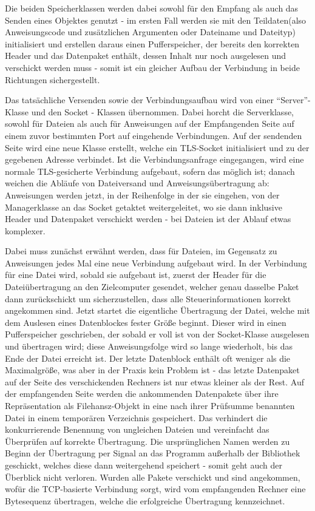Die beiden Speicherklassen werden dabei sowohl für den Empfang als auch das Senden eines Objektes genutzt - im ersten Fall werden sie mit den Teildaten(also Anweisungscode und zusätzlichen Argumenten oder Dateiname und Dateityp) initialisiert und erstellen daraus einen Pufferspeicher, der bereits den korrekten Header und das Datenpaket enthält, dessen Inhalt nur noch ausgelesen und verschickt werden muss - somit ist ein gleicher Aufbau der Verbindung in beide Richtungen sichergestellt.\par
Das tatsächliche Versenden sowie der Verbindungsaufbau wird von einer "`Server"'-Klasse und den Socket - Klassen übernommen.
Dabei horcht die Serverklasse, sowohl für Dateien als auch für Anweisungen auf der Empfangenden Seite auf einem zuvor bestimmten Port auf eingehende Verbindungen.
Auf der sendenden Seite wird eine neue Klasse erstellt, welche ein TLS-Socket initialisiert und zu der gegebenen Adresse verbindet.
Ist die Verbindungsanfrage eingegangen, wird eine normale TLS-gesicherte Verbindung aufgebaut, sofern das möglich ist; danach weichen die Abläufe von Dateiversand und Anweisungsübertragung ab: Anweisungen werden jetzt, in der Reihenfolge in der sie eingehen, von der Managerklasse an das Socket getaktet weitergeleitet, wo sie dann inklusive Header und Datenpaket verschickt werden - bei Dateien ist der Ablauf etwas komplexer.\\\par
Dabei muss zunächst erwähnt werden, dass für Dateien, im Gegensatz zu Anweisungen jedes Mal eine neue Verbindung aufgebaut wird.
In der Verbindung für eine Datei wird, sobald sie aufgebaut ist, zuerst der Header für die Dateiübertragung an den Zielcomputer gesendet, welcher genau dasselbe Paket dann zurückschickt um sicherzustellen, dass alle Steuerinformationen korrekt angekommen sind.
Jetzt startet die eigentliche Übertragung der Datei, welche mit dem Auslesen eines Datenblockes fester Größe beginnt.
Dieser wird in einen Pufferspeicher geschrieben, der sobald er voll ist von der Socket-Klasse ausgelesen und übertragen wird; diese Anweisungsfolge wird so lange wiederholt, bis das Ende der Datei erreicht ist.
Der letzte Datenblock enthält oft weniger als die Maximalgröße, was aber in der Praxis kein Problem ist - das letzte Datenpaket auf der Seite des verschickenden Rechners ist nur etwas kleiner als der Rest.
Auf der empfangenden Seite werden die ankommenden Datenpakete über ihre Repräsentation als Filehansz-Objekt in eine nach ihrer Prüfsumme benannten Datei in einem temporären Verzeichnis gespeichert. 
Das verhindert die konkurrierende Benennung von ungleichen Dateien und vereinfacht das Überprüfen auf korrekte Übertragung. 
Die ursprünglichen Namen werden zu Beginn der Übertragung per Signal an das Programm außerhalb der Bibliothek geschickt, welches diese dann weitergehend speichert - somit geht auch der Überblick nicht verloren.
Wurden alle Pakete verschickt und sind angekommen, wofür die TCP-basierte Verbindung sorgt, wird vom empfangenden Rechner eine Bytesequenz übertragen, welche die erfolgreiche Übertragung kennzeichnet.\\\par

